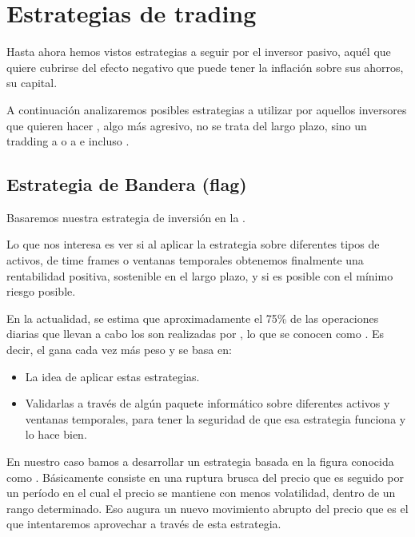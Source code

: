 \section{Estrategias de trading}

Hasta ahora hemos vistos estrategias a seguir por el inversor pasivo, aquél que quiere cubrirse del efecto negativo que puede tener la inflación sobre sus ahorros, su capital. 

A continuación analizaremos posibles estrategias a utilizar por aquellos inversores que quieren hacer , algo más agresivo, no se trata del largo plazo, sino un tradding a  o a  e incluso .

\subsection{Estrategia de Bandera (flag)}

Basaremos nuestra estrategia de inversión en la .

Lo que nos interesa es ver si al aplicar la estrategia sobre diferentes tipos de activos, de time frames o ventanas temporales obtenemos finalmente una rentabilidad positiva, sostenible en el largo plazo, y  si es posible con el mínimo riesgo posible.

En la actualidad, se estima que aproximadamente el 75\% de las operaciones diarias que llevan a cabo los  son realizadas por , lo que se conocen como . Es decir, el  gana cada vez más peso y se basa en:
\begin{itemize}
    \item La idea de aplicar estas estrategias.
    \item Validarlas a través de algún paquete informático sobre diferentes activos y ventanas temporales, para tener la seguridad de que esa estrategia funciona y lo hace bien.
\end{itemize}

En nuestro caso bamos a desarrollar un estrategia basada en la figura conocida como . Básicamente  consiste en una ruptura brusca del precio que es seguido por un período en el cual el precio se mantiene con menos volatilidad, dentro de un rango determinado. Eso augura un nuevo movimiento abrupto del precio que es el que intentaremos aprovechar a través de esta estrategia.

